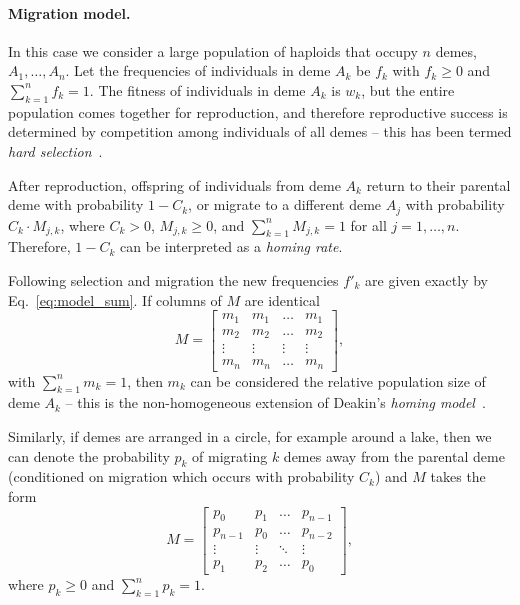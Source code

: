 \documentclass[9pt, a4paper, twocolumn]{extarticle}
\begin{document}
\paragraph*{Migration model.}\label{sec:mig_model}

In this case we consider a large population of haploids that occupy $n$ demes, $A_1, \ldots, A_n$.
Let the frequencies of individuals in deme $A_k$ be $f_k$ with $f_k \ge 0$ and $\sum_{k=1}^{n}{f_k} = 1$.
The fitness of individuals in deme $A_k$ is $w_k$, but the entire population comes together for reproduction, and therefore reproductive success is determined by competition among individuals of all demes -- this has been termed \emph{hard selection}~\citep{Wallace1975,Karlin1982}.

After reproduction, offspring of individuals from deme $A_k$ return to their parental deme with probability $1-C_k$, or migrate to a different deme $A_j$ with probability $C_k \cdot M_{j,k}$, where $C_k > 0$, $M_{j,k} \ge 0$, and $\sum_{k=1}^{n}{M_{j,k}} = 1$ for all $j=1, \ldots, n$.
Therefore, $1-C_k$ can be interpreted as a \emph{homing rate}.

Following selection and migration the new frequencies $f'_k$ are given exactly by Eq.~\ref{eq:model_sum}.
If columns of ${M}$ are identical
\begin{equation}
{M} = \begin{bmatrix}
m_1 & m_1 & \ldots & m_1 \\
m_2 & m_2 & \ldots & m_2 \\
\vdots & \vdots & \vdots & \vdots \\
m_n & m_n & \ldots & m_n
\end{bmatrix},
\end{equation}
with $\sum_{k=1}^{n}{m_k}=1$,
then $m_k$ can be considered the relative population size of deme $A_k$ --
this is the non-homogeneous extension of Deakin's \emph{homing model}~\citep{Deakin1966,Karlin1982}.

Similarly, if demes are arranged in a circle, for example around a lake, 
then we can denote the probability $p_k$ of migrating $k$ demes away from the parental deme (conditioned on migration which occurs with probability $C_k$)
and ${M}$ takes the form
\begin{equation}
{M} = \begin{bmatrix}
p_0 & p_1 & \ldots & p_{n-1} \\
p_{n-1} & p_0 & \ldots & p_{n-2} \\
\vdots & \vdots & \ddots & \vdots \\
p_1 & p_2 & \ldots & p_0
\end{bmatrix},
\end{equation}
where $p_k \ge 0$ and $\sum_{k=1}^{n}{p_k}=1$.
\end{document}
